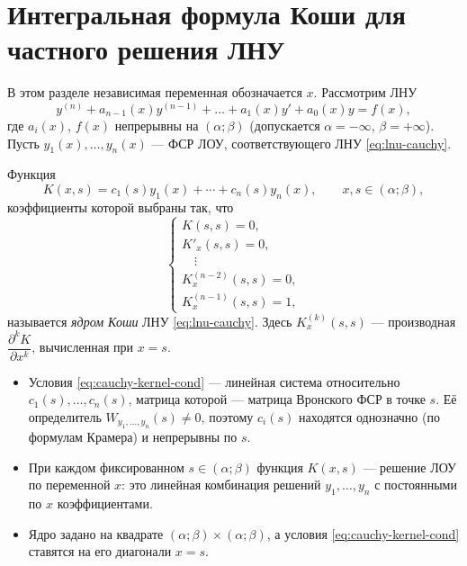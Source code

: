 \documentclass[12pt,a4paper]{article}
\numberwithin{equation}{section}
\begin{document}
\section[Интегральная формула Коши]{Интегральная формула Коши для частного решения ЛНУ}
\label{sec:cauchy}

В этом разделе независимая переменная обозначается \(x\). Рассмотрим ЛНУ
\begin{equation}
y^{(n)}+a_{n-1}(x)y^{(n-1)}+\ldots+a_1(x)y'+a_0(x)y=f(x),
\label{eq:lnu-cauchy}
\end{equation}
где \(a_i(x)\), \(f(x)\) непрерывны на \((\alpha;\beta)\) (допускается \(\alpha=-\infty\), \(\beta=+\infty\)). Пусть \(y_1(x),\ldots,y_n(x)\) --- ФСР ЛОУ, соответствующего ЛНУ \eqref{eq:lnu-cauchy}.

\begin{definitionHSE}
Функция
\begin{equation}
K(x,s)=c_1(s)y_1(x)+\cdots+c_n(s)y_n(x),\qquad x,s\in(\alpha;\beta),
\label{eq:cauchy-kernel}
\end{equation}
коэффициенты которой выбраны так, что
\begin{equation}
\begin{cases}
K(s,s)=0,\\
K'_x(s,s)=0,\\
\quad\vdots\\
K^{(n-2)}_x(s,s)=0,\\
K^{(n-1)}_x(s,s)=1,
\end{cases}
\label{eq:cauchy-kernel-cond}
\end{equation}
называется \textit{ядром Коши} ЛНУ \eqref{eq:lnu-cauchy}. Здесь \(K^{(k)}_x(s,s)\) --- производная \(\dfrac{\partial^kK}{\partial x^k}\), вычисленная при \(x=s\).
\end{definitionHSE}

\begin{remarkHSE}
\begin{itemize}
\item Условия \eqref{eq:cauchy-kernel-cond} --- линейная система относительно \(c_1(s),\ldots,c_n(s)\), матрица которой --- матрица Вронского ФСР в точке \(s\). Её определитель \(W_{y_1,\ldots,y_n}(s)\neq0\), поэтому \(c_i(s)\) находятся однозначно (по формулам Крамера) и непрерывны по \(s\).
\item При каждом фиксированном \(s\in(\alpha;\beta)\) функция \(K(x,s)\) --- решение ЛОУ по переменной \(x\): это линейная комбинация решений \(y_1,\ldots,y_n\) с постоянными по \(x\) коэффициентами.
\item Ядро задано на квадрате \((\alpha;\beta)\times(\alpha;\beta)\), а условия \eqref{eq:cauchy-kernel-cond} ставятся на его диагонали \(x=s\).
\end{itemize}
\end{remarkHSE}
\end{document}
